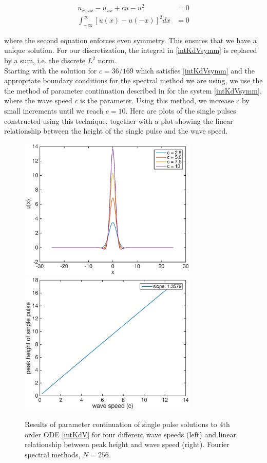 \documentclass[12pt]{article}
\begin{document}
\begin{align}\label{intKdVsymm}
u_{xxxx} - u_{xx} + c u - u^2 &= 0 \\
\int_{-\infty}^\infty \left[ u(x) - u(-x) \right]^2 dx &= 0
\end{align}

where the second equation enforces even symmetry. This ensures that we have a unique solution. For our discretization, the integral in \eqref{intKdVsymm} is replaced by a sum, i.e. the discrete $L^2$ norm.\\

Starting with the solution for $c = 36/169$ which satisfies \eqref{intKdVsymm} and the appropriate boundary conditions for the spectral method we are using, we use the the method of parameter continuation described in \cite{Beyn2002} for the system \eqref{intKdVsymm}, where the wave speed $c$ is the parameter. Using this method, we increase $c$ by small increments until we reach $c = 10$. Here are plots of the single pulses constructed using this technique, together with a plot showing the linear relationship between the height of the single pulse and the wave speed.

\begin{figure}[H]
	\includegraphics[width=8.5cm]{continuation.eps}
	\includegraphics[width=8.5cm]{heightvsspeed.eps}
	\caption{Results of parameter continuation of single pulse solutions to 4th order ODE \eqref{intKdV} for four different wave speeds (left) and linear relationship between peak height and wave speed (right). Fourier spectral methods, $N = 256$.}
\end{figure}
\end{document}
